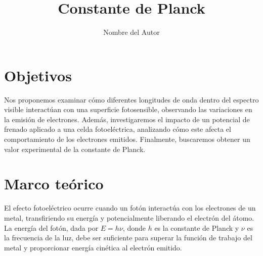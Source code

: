 \documentclass[twocolumn,a4paper,11pt]{scrartcl}
\title{Constante de Planck}
\author{Nombre del Autor}
\date{}
\begin{document}

\section{Objetivos}
Nos proponemos examinar cómo diferentes longitudes de onda dentro del espectro visible interactúan con una superficie fotosensible, observando las variaciones en la emisión de electrones. Además, investigaremos el impacto de un potencial de frenado aplicado a una celda fotoeléctrica, analizando cómo este afecta el comportamiento de los electrones emitidos. Finalmente, buscaremos obtener un valor experimental de la constante de Planck.

\section{Marco teórico}

El efecto fotoeléctrico ocurre cuando un fotón interactúa con los electrones de un metal, transfiriendo su energía y potencialmente liberando el electrón del átomo. La energía del fotón, dada por $E = h\nu$, donde $h$ es la constante de Planck y $\nu$ es la frecuencia de la luz, debe ser suficiente para superar la función de trabajo del metal y proporcionar energía cinética al electrón emitido.
\end{document}
